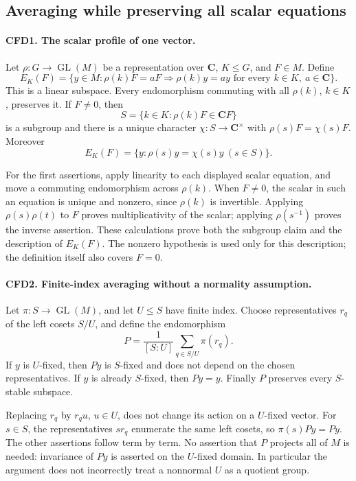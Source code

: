 \documentclass[11pt,a4paper]{article}
\numberwithin{equation}{section}
\theoremstyle{remark}\newtheorem{remark}[theorem]{Remark}
\begin{document}
\subsection{Averaging while preserving all scalar equations}

\paragraph{CFD1. The scalar profile of one vector.}
\label{claim:CFD1}
Let \(\rho:G\to\operatorname{GL}(M)\) be a representation over
\(\mathbf C\), \(K\le G\), and \(F\in M\).  Define
\[
 E_K(F)=\{y\in M: \rho(k)F=aF\Longrightarrow \rho(k)y=ay
                       \text{ for every }k\in K,\ a\in\mathbf C\}.
\]
This is a linear subspace.  Every endomorphism commuting with all
\(\rho(k)\), \(k\in K\), preserves it.  If \(F\ne0\), then
\[
 S=\{k\in K:\rho(k)F\in\mathbf C F\}
\]
is a subgroup and there is a unique character
\(\chi:S\to\mathbf C^\times\) with \(\rho(s)F=\chi(s)F\).
Moreover
\[
 E_K(F)=\{y:\rho(s)y=\chi(s)y\ (s\in S)\}.
\]

For the first assertions, apply linearity to each displayed scalar
equation, and move a commuting endomorphism across \(\rho(k)\).
When \(F\ne0\), the scalar in such an equation is unique and nonzero,
since \(\rho(k)\) is invertible.  Applying \(\rho(s)\rho(t)\) to
\(F\) proves multiplicativity of the scalar; applying \(\rho(s^{-1})\)
proves the inverse assertion.  These calculations prove both the subgroup
claim and the description of \(E_K(F)\).  The nonzero hypothesis is used
only for this description; the definition itself also covers \(F=0\).

\paragraph{CFD2. Finite-index averaging without a normality assumption.}
\label{claim:CFD2}
Let \(\pi:S\to\operatorname{GL}(M)\), and let \(U\le S\) have
finite index.  Choose representatives \(r_q\) of the left cosets
\(S/U\), and define the endomorphism
\[
 P=\frac1{[S:U]}\sum_{q\in S/U}\pi(r_q).
\]
If \(y\) is \(U\)-fixed, then \(Py\) is \(S\)-fixed and does not
depend on the chosen representatives.  If \(y\) is already \(S\)-fixed,
then \(Py=y\).  Finally \(P\) preserves every \(S\)-stable subspace.

Replacing \(r_q\) by \(r_qu\), \(u\in U\), does not change its
action on a \(U\)-fixed vector.  For \(s\in S\), the representatives
\(sr_q\) enumerate the same left cosets, so \(\pi(s)Py=Py\).
The other assertions follow term by term.  No assertion that \(P\)
projects all of \(M\) is needed: invariance of \(Py\) is asserted on
the \(U\)-fixed domain.  In particular the argument does not incorrectly
treat a nonnormal \(U\) as a quotient group.
\end{document}
